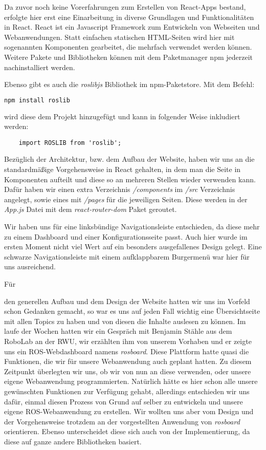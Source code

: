 \begin{flushleft}

Da zuvor noch keine Vorerfahrungen zum Erstellen von React-Apps bestand, erfolgte hier erst eine Einarbeitung in diverse Grundlagen und Funktionalitäten in  React. React ist ein Javascript Framework zum Entwickeln von Webseiten und Webanwendungen. Statt einfachen statischen HTML-Seiten wird hier mit sogenannten Komponenten gearbeitet, die mehrfach verwendet werden können. Weitere Pakete und Bibliotheken können mit dem Paketmanager npm jederzeit nachinstalliert werden.

Ebenso gibt es auch die \textit{roslibjs} Bibliothek im npm-Paketstore. Mit dem Befehl:
\begin{lstlisting}[language=bash]
    npm install roslib 
\end{lstlisting}

wird diese dem Projekt hinzugefügt und kann in folgender Weise inkludiert werden:

\begin{lstlisting}
    import ROSLIB from 'roslib';
\end{lstlisting}

Bezüglich der Architektur, bzw. dem Aufbau der Website, haben wir uns an die standardmäßige Vorgehensweise in React gehalten, in dem man die Seite in Komponenten aufteilt und diese so an mehreren Stellen wieder verwenden kann. Dafür haben wir einen extra Verzeichnis \textit{/components} im \textit{/src} Verzeichnis angelegt, sowie eines mit \textit{/pages} für die jeweiligen Seiten. Diese werden in der \textit{App.js} Datei mit dem \textit{react-router-dom} Paket geroutet.


Wir haben uns für eine linksbündige Navigationsleiste entschieden, da diese mehr zu einem Dashboard und einer Konfigurationsseite passt. Auch hier wurde im ersten Moment nicht viel Wert auf ein besonders ausgefallenes Design gelegt. Eine schwarze Navigationsleiste mit einem aufklappbarem Burgermenü war hier für uns ausreichend. 

\hypertarget{rosboard-target}{Für} den generellen Aufbau und dem Design der Website hatten wir uns im Vorfeld schon Gedanken gemacht, so war es uns auf jeden Fall wichtig eine Übersichtseite mit allen Topics zu haben und von diesen die Inhalte auslesen zu können. Im laufe der Wochen hatten wir ein Gespräch mit Benjamin Stähle aus dem RoboLab an der RWU, wir erzählten ihm von unserem Vorhaben und er zeigte uns ein ROS-Webdashboard namens \textit{rosboard}. Diese Plattform hatte quasi die Funktionen, die wir für unsere Webanwendung auch geplant hatten. Zu diesem Zeitpunkt überlegten wir uns, ob wir von nun an diese verwenden, oder unsere eigene Webanwendung programmierten. Natürlich hätte es hier schon alle unsere gewünschten Funktionen zur Verfügung gehabt, allerdings entschieden wir uns dafür, einmal diesen Prozess von Grund auf selber zu entwickeln und unsere eigene ROS-Webanwendung zu erstellen. Wir wollten uns aber vom Design und der Vorgehensweise trotzdem an der vorgestellten Anwendung von \textit{rosboard} orientieren. Ebenso unterscheidet diese sich auch von der Implementierung, da diese auf ganze andere Bibliotheken basiert.

\end{flushleft}
    